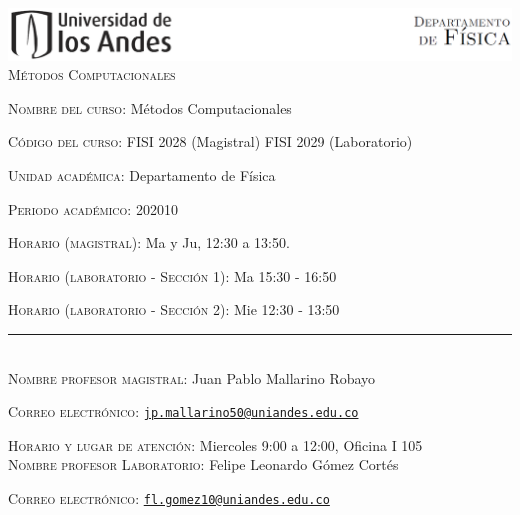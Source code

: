 \documentclass[letterpaper,10pt,onecolumn]{article}
\begin{document}
\begin{center}

\includegraphics[width=490pt]{../imagenes/header.png}\\[0.5cm]

\textsc{\LARGE M\'etodos Computacionales}\\[0.1cm]

\end{center}

\large \noindent\textsc{Nombre del curso:}  M\'etodos Computacionales%
  
\noindent\textsc{C\'odigo del curso:} FISI 2028 (Magistral) FISI 2029 (Laboratorio) %

\noindent\textsc{Unidad acad\'emica:} Departamento de F\'isica

\noindent\textsc{Periodo acad\'emico:} 202010 %

\noindent\textsc{Horario (magistral):} Ma y Ju, 12:30 a 13:50.

\noindent\textsc{Horario (laboratorio - Secci\'on 1):} Ma 15:30 - 16:50

\noindent\textsc{Horario (laboratorio - Secci\'on 2):} Mie 12:30 - 13:50

\noindent\rule{\textwidth}{1pt}\\[-0.3cm]

\normalsize \noindent\textsc{Nombre profesor magistral:}
Juan Pablo Mallarino Robayo%

\noindent\textsc{Correo electr\'onico:}
\href{mailto:jp.mallarino50@uniandes.edu.co}{\nolinkurl{jp.mallarino50@uniandes.edu.co}}

\noindent\textsc{Horario y lugar de atenci\'on:} Miercoles 9:00 a 12:00, Oficina I 105 \\[-0.1cm]

\normalsize \noindent\textsc{Nombre profesor Laboratorio:}
Felipe Leonardo G\'omez Cort\'es %

\noindent\textsc{Correo electr\'onico:}
\href{mailto:fl.gomez10@uniandes.edu.co}{\nolinkurl{fl.gomez10@uniandes.edu.co}}
\end{document}
